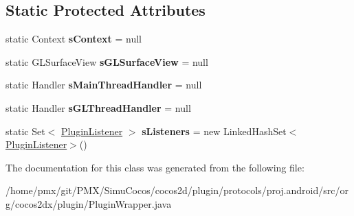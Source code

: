\subsection*{Static Protected Attributes}
\begin{DoxyCompactItemize}
\item 
\mbox{\label{classorg_1_1cocos2dx_1_1plugin_1_1PluginWrapper_aee8bc240363b825ed88c0138edc85bfe}} 
static Context {\bfseries s\+Context} = null
\item 
\mbox{\label{classorg_1_1cocos2dx_1_1plugin_1_1PluginWrapper_adc941ac40f6bf93e026af858c96f3205}} 
static G\+L\+Surface\+View {\bfseries s\+G\+L\+Surface\+View} = null
\item 
\mbox{\label{classorg_1_1cocos2dx_1_1plugin_1_1PluginWrapper_ae1210edfaa4b6d2a72640f65f8aad5d6}} 
static Handler {\bfseries s\+Main\+Thread\+Handler} = null
\item 
\mbox{\label{classorg_1_1cocos2dx_1_1plugin_1_1PluginWrapper_ac198bfa631f94585900e3969103188ef}} 
static Handler {\bfseries s\+G\+L\+Thread\+Handler} = null
\item 
\mbox{\label{classorg_1_1cocos2dx_1_1plugin_1_1PluginWrapper_a073a581b9a3967c7632aee7bd542889e}} 
static Set$<$ \hyperlink{interfaceorg_1_1cocos2dx_1_1plugin_1_1PluginListener}{Plugin\+Listener} $>$ {\bfseries s\+Listeners} = new Linked\+Hash\+Set$<$\hyperlink{interfaceorg_1_1cocos2dx_1_1plugin_1_1PluginListener}{Plugin\+Listener}$>$()
\end{DoxyCompactItemize}


The documentation for this class was generated from the following file\+:\begin{DoxyCompactItemize}
\item 
/home/pmx/git/\+P\+M\+X/\+Simu\+Cocos/cocos2d/plugin/protocols/proj.\+android/src/org/cocos2dx/plugin/Plugin\+Wrapper.\+java\end{DoxyCompactItemize}
